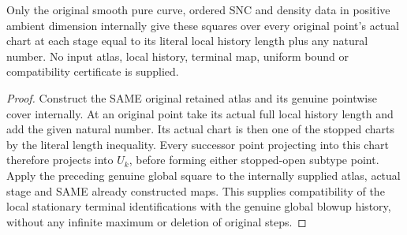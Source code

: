 \begin{corollary}
\label{hir:sharp-actual-curve-original-stopped-successor-square}
\leanok
Only the original smooth pure curve, ordered SNC and density data in
positive ambient dimension internally give these squares over every
original point's actual chart at each stage equal to its literal local
history length plus any natural number. No input atlas, local history,
terminal map, uniform bound or compatibility certificate is supplied.
\end{corollary}
\begin{proof}
Construct the SAME original retained atlas and its genuine pointwise
cover internally. At an original point take its actual full local history
length and add the given natural number. Its actual chart is then one of
the stopped charts by the literal length inequality. Every successor
point projecting into this chart therefore projects into $U_k$, before
forming either stopped-open subtype point. Apply the preceding genuine
global square to the internally supplied atlas, actual stage and SAME
already constructed maps. This supplies compatibility of the local
stationary terminal identifications with the genuine global blowup
history, without any infinite maximum or deletion of original steps.
\end{proof}
